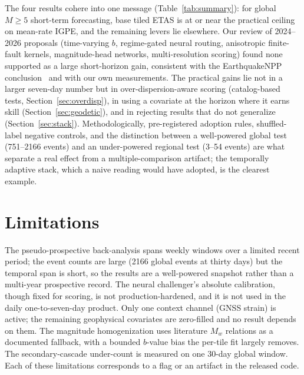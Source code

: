 \documentclass[journal]{IEEEtran}
\begin{document}
The four results cohere into one message (Table~\ref{tab:summary}): for global $M\!\ge\!5$
short-term forecasting, base tiled ETAS is at or near the practical ceiling on mean-rate IGPE,
and the remaining levers lie elsewhere. Our review of 2024--2026 proposals (time-varying $b$,
regime-gated neural routing, anisotropic finite-fault kernels, magnitude-head networks,
multi-resolution scoring) found none supported as a large short-horizon gain, consistent with
the EarthquakeNPP conclusion~\cite{stockman2026} and with our own measurements. The practical
gains lie not in a larger seven-day number but in over-dispersion-aware scoring (catalog-based
tests, Section~\ref{sec:overdisp}), in using a covariate at the horizon where it earns skill
(Section~\ref{sec:geodetic}), and in rejecting results that do not generalize
(Section~\ref{sec:stack}). Methodologically, pre-registered adoption rules, shuffled-label
negative controls, and the distinction between a well-powered global test (751--2166 events)
and an under-powered regional test (3--54 events) are what separate a real effect from a
multiple-comparison artifact; the temporally adaptive stack, which a naive reading would have
adopted, is the clearest example.

\section{Limitations}

The pseudo-prospective back-analysis spans weekly windows over a limited recent period; the
event counts are large (2166 global events at thirty days) but the temporal span is short, so
the results are a well-powered snapshot rather than a multi-year prospective record. The
neural challenger's absolute calibration, though fixed for scoring, is not production-hardened,
and it is not used in the daily one-to-seven-day product. Only one context channel (GNSS
strain) is active; the remaining geophysical covariates are zero-filled and no result depends
on them. The magnitude homogenization uses literature $M_w$ relations as a documented fallback,
with a bounded $b$-value bias the per-tile fit largely removes. The secondary-cascade
under-count is measured on one 30-day global window. Each of these limitations corresponds to
a flag or an artifact in the released code.

\end{document}

